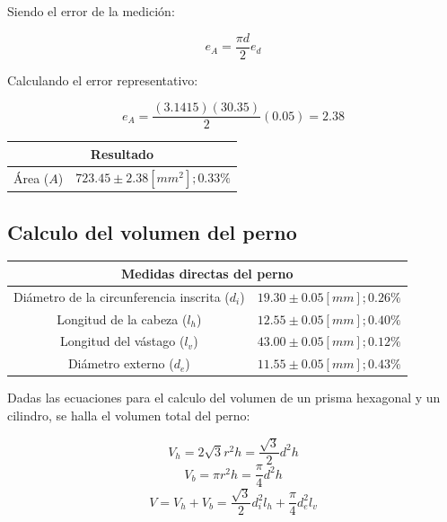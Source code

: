 \documentclass[letter,11pt]{article}
\begin{document}
Siendo el error de la medición:

\begin{equation}
    e_A = \frac{\pi d}{2} e_d
\end{equation}

Calculando el error representativo:

\begin{equation*}
    e_A = \frac{(3.1415)(30.35)}{2}(0.05) = 2.38
\end{equation*}

\begin{center}
\begin{tabular}{|c|>{\centering}m{5.0cm}<{\centering}|}
\hline
\multicolumn{2}{|c|}{\textbf{Resultado}}
\tabularnewline \hline
Área ($A$) & $723.45 \pm 2.38 [mm^2]; 0.33\%$ \tabularnewline \hline
\end{tabular}
\end{center}

\subsection{Calculo del volumen del perno}
\vspace*{0.25cm}
\begin{center}
\begin{tabular}{|c|>{\centering}m{5.0cm}<{\centering}|}
\hline
\multicolumn{2}{|c|}{\textbf{Medidas directas del perno}}
\tabularnewline \hline
Diámetro de la circunferencia inscrita ($d_i$) & $19.30 \pm 0.05 [mm]; 0.26\%$
\tabularnewline \hline
                 Longitud de la cabeza ($l_h$) & $12.55 \pm 0.05 [mm]; 0.40\%$
\tabularnewline \hline
                  Longitud del vástago ($l_v$) & $43.00 \pm 0.05 [mm]; 0.12\%$
\tabularnewline \hline
                      Diámetro externo ($d_e$) & $11.55 \pm 0.05 [mm]; 0.43\%$
\tabularnewline \hline
\end{tabular}
\end{center}

Dadas las ecuaciones para el calculo del volumen de un prisma hexagonal y un
cilindro, se halla el volumen total del perno:

\begin{equation}
    V_h = 2\sqrt{3} r^2 h = \frac{\sqrt{3}}{2} d^2 h
\tag{prisma}
\end{equation}
\begin{equation}
    V_b = \pi r^2 h = \frac{\pi}{4} d^2 h
\tag{cilindro}
\end{equation}
\begin{equation}
    V = V_h + V_b = \frac{\sqrt{3}}{2} d_i^2 l_h + \frac{\pi}{4} d_e^2 l_v
\end{equation}
\end{document}
